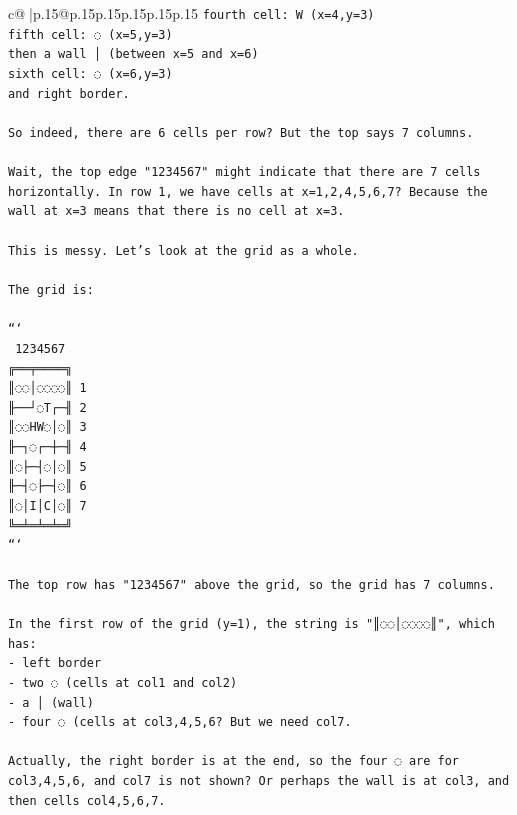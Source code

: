 \documentclass{article}
\begin{document}
{\begin{supertabular}{c@{$\;$}|p{.15\linewidth}@{}p{.15\linewidth}p{.15\linewidth}p{.15\linewidth}p{.15\linewidth}p{.15\linewidth}}
{{{\texttt{fourth cell: W (x=4,y=3)} \\
\texttt{fifth cell: ◌ (x=5,y=3)} \\
\texttt{then a wall │ (between x=5 and x=6)} \\
\texttt{sixth cell: ◌ (x=6,y=3)} \\
\texttt{and right border.} \\
\\ 
\texttt{So indeed, there are 6 cells per row? But the top says 7 columns.} \\
\\ 
\texttt{Wait, the top edge "1234567" might indicate that there are 7 cells horizontally. In row 1, we have cells at x=1,2,4,5,6,7? Because the wall at x=3 means that there is no cell at x=3.} \\
\\ 
\texttt{This is messy. Let's look at the grid as a whole.} \\
\\ 
\texttt{The grid is:} \\
\\ 
\texttt{```} \\
\texttt{ 1234567} \\
\texttt{╔══╤════╗} \\
\texttt{║◌◌│◌◌◌◌║ 1} \\
\texttt{╟──┘◌T┌─╢ 2} \\
\texttt{║◌◌HW◌│◌║ 3} \\
\texttt{╟─┐◌┌─┼─╢ 4} \\
\texttt{║◌├─┤◌│◌║ 5} \\
\texttt{╟─┤◌├─┤◌║ 6} \\
\texttt{║◌│I│C│◌║ 7} \\
\texttt{╚═╧═╧═╧═╝} \\
\texttt{```} \\
\\ 
\texttt{The top row has "1234567" above the grid, so the grid has 7 columns.} \\
\\ 
\texttt{In the first row of the grid (y=1), the string is "║◌◌│◌◌◌◌║", which has:} \\
\texttt{{-} left border} \\
\texttt{{-} two ◌ (cells at col1 and col2)} \\
\texttt{{-} a │ (wall)} \\
\texttt{{-} four ◌ (cells at col3,4,5,6? But we need col7.} \\
\\ 
\texttt{Actually, the right border is at the end, so the four ◌ are for col3,4,5,6, and col7 is not shown? Or perhaps the wall is at col3, and then cells col4,5,6,7.} \\
}}}
\end{supertabular}}
\end{document}
